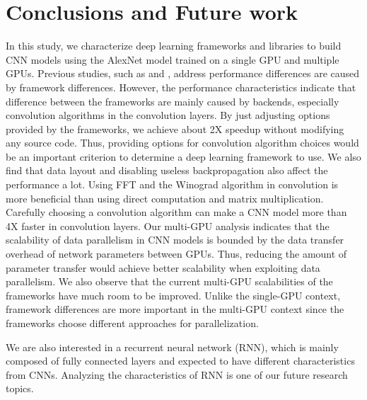 \section{Conclusions and Future work}
In this study, we characterize deep learning frameworks and libraries to build CNN models using the AlexNet model trained on a single GPU and multiple GPUs.
Previous studies, such as \cite{DBLP:journals/corr/RussakovskyDSKSMHKKBBF14} and \cite{convnet-benchmarks}, address performance differences are caused by framework differences.
However, the performance characteristics indicate that difference between the frameworks are mainly caused by backends, especially convolution algorithms in the convolution layers.
By just adjusting options provided by the frameworks, we achieve about 2X speedup without modifying any source code.
Thus, providing options for convolution algorithm choices would be an important criterion to determine a deep learning framework to use.
We also find that data layout and disabling useless backpropagation also affect the performance a lot.
Using FFT and the Winograd algorithm in convolution is more beneficial than using direct computation and matrix multiplication.
Carefully choosing a convolution algorithm can make a CNN model more than 4X faster in convolution layers.
Our multi-GPU analysis indicates that the scalability of data parallelism in CNN models is bounded by the data transfer overhead of network parameters between GPUs.
Thus, reducing the amount of parameter transfer would achieve better scalability when exploiting data parallelism.
We also observe that the current multi-GPU scalabilities of the frameworks have much room to be improved.
Unlike the single-GPU context, framework differences are more important in the multi-GPU context since the frameworks choose different approaches for parallelization.

We are also interested in a recurrent neural network (RNN), which is mainly composed of fully connected layers and expected to have different characteristics from CNNs.
Analyzing the characteristics of RNN is one of our future research topics.
